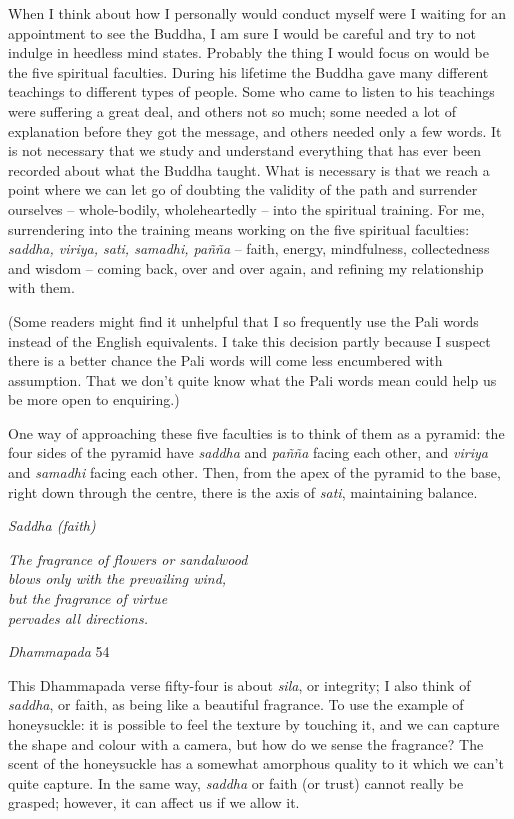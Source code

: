 When I think about how I personally would conduct myself were I waiting
for an appointment to see the Buddha, I am sure I would be careful and
try to not indulge in heedless mind states. Probably the thing I would
focus on would be the five spiritual faculties. During his lifetime the
Buddha gave many different teachings to different types of people. Some
who came to listen to his teachings were suffering a great deal, and
others not so much; some needed a lot of explanation before they got the
message, and others needed only a few words. It is not necessary that we
study and understand everything that has ever been recorded about what
the Buddha taught. What is necessary is that we reach a point where we
can let go of doubting the validity of the path and surrender ourselves
-- whole-bodily, wholeheartedly -- into the spiritual training. For me,
surrendering into the training means working on the five spiritual
faculties: \emph{saddha, viriya, sati, samadhi, pañña} -- faith, energy,
mindfulness, collectedness and wisdom -- coming back, over and over
again, and refining my relationship with them.

(Some readers might find it unhelpful that I so frequently use the Pali
words instead of the English equivalents. I take this decision partly
because I suspect there is a better chance the Pali words will come less
encumbered with assumption. That we don't quite know what the Pali words
mean could help us be more open to enquiring.)

One way of approaching these five faculties is to think of them as a
pyramid: the four sides of the pyramid have \emph{saddha} and
\emph{pañña} facing each other, and \emph{viriya} and \emph{samadhi}
facing each other. Then, from the apex of the pyramid to the base, right
down through the centre, there is the axis of \emph{sati}, maintaining
balance.

\emph{Saddha (faith)}

\emph{The fragrance of flowers or sandalwood\\
blows only with the prevailing wind,\\
but the fragrance of virtue\\
pervades all directions.}

\emph{Dhammapada} 54

This Dhammapada verse fifty-four is about \emph{sila}, or integrity; I
also think of \emph{saddha}, or faith, as being like a beautiful
fragrance. To use the example of honeysuckle: it is possible to feel the
texture by touching it, and we can capture the shape and colour with a
camera, but how do we sense the fragrance? The scent of the honeysuckle
has a somewhat amorphous quality to it which we can't quite capture. In
the same way, \emph{saddha} or faith (or trust) cannot really be
grasped; however, it can affect us if we allow it.

